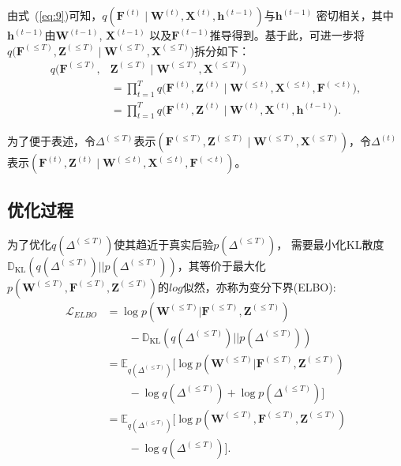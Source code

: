 由式~(\ref{eq:9})可知，$q(\mathbf{F}^{(t)} \mid \mathbf{W}^{(t)},\mathbf{X}^{(t)},\mathbf{h}^{(t-1)})$与$\bm{h}^{(t-1)}$ 密切相关，其中$\bm{h}^{(t-1)}$由$\mathbf{W}^{(t-1)}$, $\mathbf{X}^{(t-1)}$ 以及$\mathbf{F}^{(t-1)}$推导得到。基于此，可进一步将$q\bigl(\mathbf{F}^{(\leq T)}, \mathbf{Z}^{(\leq T)} \mid \mathbf{W}^{(\leq T)}, \mathbf{X}^{(\leq T)}\bigr)$拆分如下：
\begin{align}
    q\bigl(\mathbf{F}^{(\leq T)}, & \mathbf{Z}^{(\leq T)} \mid \mathbf{W}^{(\leq T)}, \mathbf{X}^{(\leq T)}\bigr) \nonumber\\
    & = \prod_{t=1}^{T} q\bigl(\mathbf{F}^{(t)}, \mathbf{Z}^{(t)} \mid \mathbf{W}^{(\leq t)}, \mathbf{X}^{(\leq t)}, \mathbf{F}^{(< t)}\bigr), \nonumber\\
    & = \prod_{t=1}^{T} q\bigl(\mathbf{F}^{(t)}, \mathbf{Z}^{(t)} \mid \mathbf{W}^{(t)}, \mathbf{X}^{(t)}, \mathbf{h}^{(t-1)}\bigr).
    \label{eq:13}
\end{align}

为了便于表述，令$\Delta^{(\leq T)}$表示$ (\mathbf{F}^{(\leq T)}, \mathbf{Z}^{(\leq T)} \mid \mathbf{W}^{(\leq T)}, \mathbf{X}^{(\leq T)})$，令$\Delta^{(t)}$表示$(\mathbf{F}^{(t)}, \mathbf{Z}^{(t)} \mid \mathbf{W}^{(\leq t)}, \mathbf{X}^{(\leq t)}, \mathbf{F}^{(< t)})$。


\subsection{优化过程}
为了优化$q(\Delta^{(\le T)})$使其趋近于真实后验$p(\Delta^{(\le T)})$， 需要最小化KL散度$\mathbb{D_{\mathrm{KL}}}(q(\Delta^{(\le T)})||p(\Delta^{(\le T)}))$，其等价于最大化$p(\mathbf{W}^{(\leq T)},\mathbf{F}^{(\leq T)},\mathbf{Z}^{(\leq T)})$的$log$似然，亦称为变分下界(ELBO):
\begin{align}
\mathcal{L}_{ELBO} &= \log{p(\mathbf{W}^{(\leq T)}|\mathbf{F}^{(\leq T)},\mathbf{Z}^{(\leq T)})} \nonumber\\
& \quad \quad - \mathbb{D_{\mathrm{KL}}}(q(\Delta^{(\le T)})||p(\Delta^{(\le T)})) \nonumber\\
& = \mathbb{E}_{q(\Delta^{(\leq T)})}\Big[\log{p(\mathbf{W}^{(\leq T)}|\mathbf{F}^{(\leq T)},\mathbf{Z}^{(\leq T)})} \nonumber\\
& \quad \quad - \log{q(\Delta^{(\le T)})} + \log{p(\Delta^{(\le T)})}\Big] \nonumber \\
&= \mathbb{E}_{q(\Delta^{(\leq T)})} \Big[ \log{p(\mathbf{W}^{(\leq T)},\mathbf{F}^{(\leq T)},\mathbf{Z}^{(\leq T)})} \nonumber \\
& \quad \quad - \log{q(\Delta^{(\leq T)})} \Big]. \label{eq:14}
\end{align}


